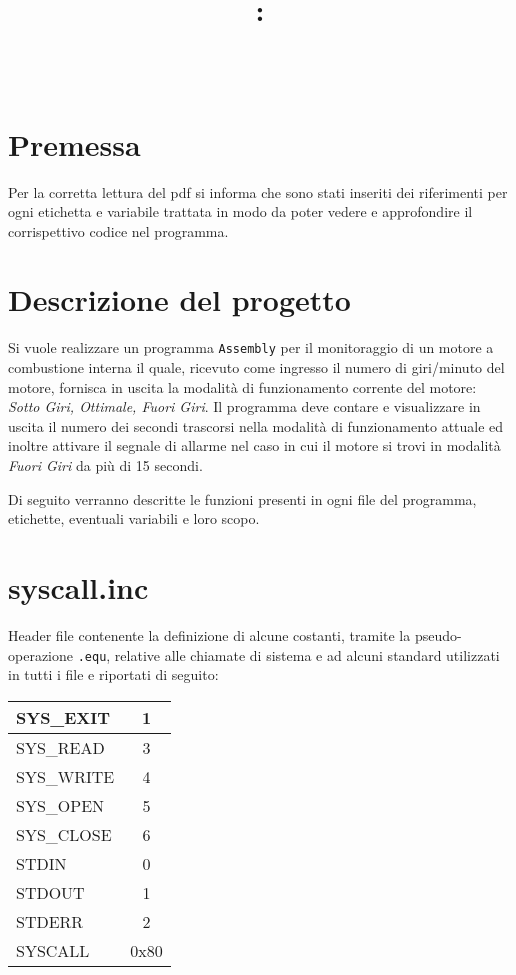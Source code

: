 \documentclass[a4paper,11pt]{article}
\title{
\vspace{2in}
\textmd{\textbf{\hmwkClass:\\ \hmwkTitle}}\\
\vspace{0.1in}\large{\textit{\hmwkAuthorName}}
\vspace{3in}
}
\newcommand{\Assembly}{\texttt{Assembly} }
\begin{document}
	\clearpage
	\maketitle
	\thispagestyle{empty}
	\newpage
	\tableofcontents
	\newpage
	
	\section{Premessa}
	Per la corretta lettura del pdf si informa che sono stati inseriti dei riferimenti per ogni etichetta e variabile trattata in modo da poter vedere e approfondire il corrispettivo codice nel programma. 
	
	\section{Descrizione del progetto}
	Si vuole realizzare un programma \Assembly per il monitoraggio di un motore a combustione interna il quale, ricevuto come ingresso il numero di giri/minuto del motore, fornisca in uscita la modalità di funzionamento corrente del motore: \textit{Sotto Giri, Ottimale, Fuori Giri}. Il programma deve contare e visualizzare in uscita il numero dei secondi trascorsi nella modalità di funzionamento attuale ed inoltre attivare il segnale di allarme nel caso in cui il motore si trovi in modalità \textit{Fuori Giri} da più di 15 secondi.
	
	\vspace {5mm}
	Di seguito verranno descritte le funzioni presenti in ogni file del programma, etichette, eventuali variabili e loro scopo. 
	
	\section{syscall.inc}
	Header file contenente la definizione di alcune costanti, tramite la pseudo-operazione \texttt{.equ}, relative alle chiamate di sistema e ad alcuni standard utilizzati in tutti i file e riportati di seguito:
	\begin{table}[!h]
		\begin{tabular}{| >{\ttfamily}l | c |}
			\hline
			SYS\_EXIT & 1 \\ \hline
			SYS\_READ & 3 \\ \hline
			SYS\_WRITE & 4 \\ \hline
			SYS\_OPEN & 5 \\ \hline
			SYS\_CLOSE & 6 \\ \hline
			STDIN & 0 \\ \hline
			STDOUT & 1 \\ \hline
			STDERR & 2			 \\ \hline
			SYSCALL & 0x80 \\ \hline
		\end{tabular}
	\end{table}
	
\end{document}

